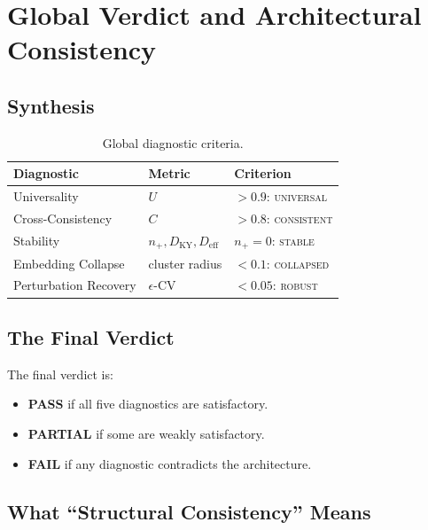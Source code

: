 \documentclass[11pt,twoside,openright]{book}
\theoremstyle{definition}
\theoremstyle{plain}
\theoremstyle{definition}
\theoremstyle{remark}
\begin{document}
\chapter{Global Verdict and Architectural Consistency}\label{ch:verdict}

\section{Synthesis}

\begin{table}[ht]
\centering
\caption{Global diagnostic criteria.}\label{tab:diagnostics}
\begin{tabular}{@{}llp{4cm}@{}}
\toprule
Diagnostic & Metric & Criterion \\
\midrule
Universality            & \(U\)             & \(> 0.9\): \textsc{universal} \\
Cross-Consistency       & \(C\)             & \(> 0.8\): \textsc{consistent} \\
Stability               & \(n_+, D_{\mathrm{KY}}, D_{\mathrm{eff}}\) & \(n_+ = 0\): \textsc{stable} \\
Embedding Collapse      & cluster radius    & \(< 0.1\): \textsc{collapsed} \\
Perturbation Recovery   & \(\epsilon\)-CV   & \(< 0.05\): \textsc{robust} \\
\bottomrule
\end{tabular}
\end{table}

\section{The Final Verdict}

The final verdict is:
\begin{itemize}
\item \textbf{PASS} if all five diagnostics are satisfactory.
\item \textbf{PARTIAL} if some are weakly satisfactory.
\item \textbf{FAIL} if any diagnostic contradicts the architecture.
\end{itemize}

\section{What ``Structural Consistency'' Means}
\end{document}
